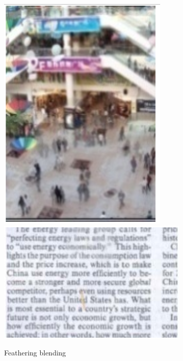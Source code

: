 \begin{figure}[h]
\centering
\begin{subfigure}[b]{0.495\textwidth}
\includegraphics[scale=0.22]{images/feathering1}
\includegraphics[scale=0.24]{images/feathering2}
\caption{Feathering blending}
\label{fig:feathering}
\end{subfigure}
\begin{subfigure}[b]{0.495\textwidth}

\end{subfigure}
\end{figure}
